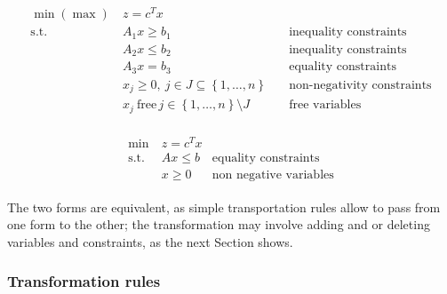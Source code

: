 \documentclass[english]{article}
\begin{document}
\begin{gather}
  \begin{aligned}
    \min (\max) \  & z = c^T x                                                                                                \\
    \text{s.t.} \  & A_1 x \geq b_1 \quad                                                 & \text{inequality constraints}     \\
                   & A_2 x \leq b_2 \quad                                                 & \text{inequality constraints}     \\
                   & A_3 x = b_3 \quad                                                    & \text{equality constraints}       \\
                   & x_j \geq 0,\ j \in J \subseteq \left\{ 1, \ldots, n \right\} \quad   & \text{non-negativity constraints} \\
                   & x_j \ \text{free} \, j \in \left\{ 1, \ldots, n \right\} \setminus J & \text{free variables}
  \end{aligned}
  \label{eq:linear-programming-general-form}
\end{gather}

\begin{gather}
  \begin{aligned}
    \min \         & z = c^T x &                               \\
    \text{s.t.} \  & Ax \leq b & \text{equality constraints}   \\
                   & x \geq 0  & \text{non negative variables}
  \end{aligned}
  \label{eq:linear-programming-standard-form}
\end{gather}

The two forms are equivalent, as simple transportation rules allow to pass from one form to the other;
the transformation may involve adding and or deleting variables and constraints, as the next Section shows.

\subsubsection{Transformation rules}
\end{document}
